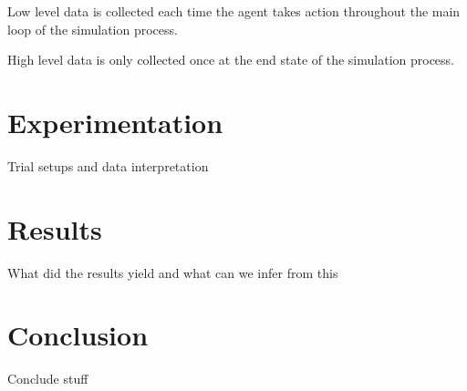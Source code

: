 \documentclass[]{report}
\begin{document}
Low level data is collected each time the agent takes action throughout the main loop of the simulation process.

High level data is only collected once at the end state of the simulation process.



\chapter{Experimentation}
Trial setups and data interpretation



\chapter{Results}
What did the results yield and what can we infer from this



\chapter{Conclusion}
Conclude stuff




\end{document}
